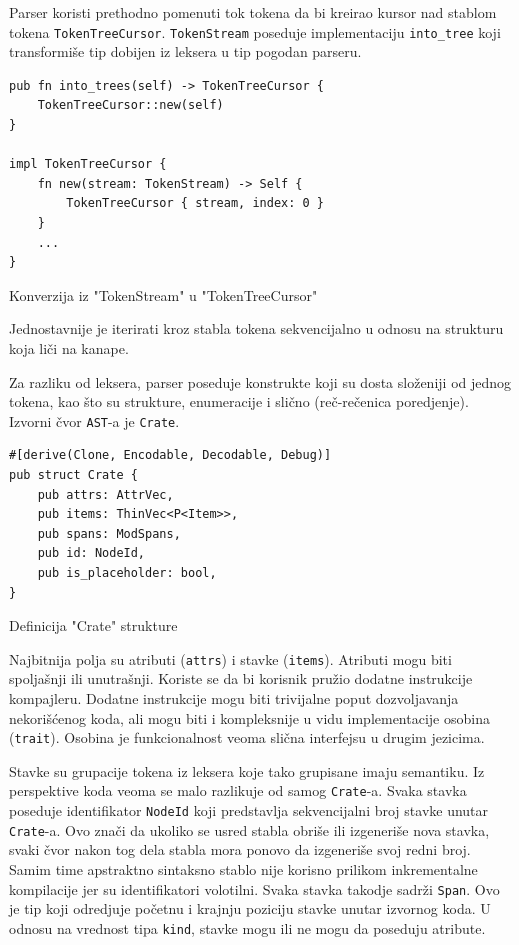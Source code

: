 \documentclass[11pt]{article}
\begin{document}
Parser koristi prethodno pomenuti tok tokena da bi kreirao kursor nad stablom tokena \verb|TokenTreeCursor|.
\verb|TokenStream| poseduje implementaciju \verb|into_tree| koji transformiše tip dobijen iz leksera
u tip pogodan parseru.

\begin{listing}[H]
\begin{verbatim}
pub fn into_trees(self) -> TokenTreeCursor {
    TokenTreeCursor::new(self)
}

impl TokenTreeCursor {
    fn new(stream: TokenStream) -> Self {
        TokenTreeCursor { stream, index: 0 }
    }
    ...
}
\end{verbatim}
\caption{Konverzija iz "TokenStream" u "TokenTreeCursor"}
\end{listing}
Jednostavnije je iterirati kroz stabla tokena sekvencijalno u odnosu na strukturu koja liči na kanape.

Za razliku od leksera, parser poseduje konstrukte koji su dosta složeniji od jednog tokena, kao što su 
strukture, enumeracije i slično (reč-rečenica poredjenje). Izvorni čvor \verb|AST|-a je \verb|Crate|.

\begin{listing}[H]
\begin{verbatim}
#[derive(Clone, Encodable, Decodable, Debug)]
pub struct Crate {
    pub attrs: AttrVec,
    pub items: ThinVec<P<Item>>,
    pub spans: ModSpans,
    pub id: NodeId,
    pub is_placeholder: bool,
}
\end{verbatim}
\caption{Definicija "Crate" strukture}
\end{listing}

\newpage

Najbitnija polja su atributi (\verb|attrs|) i stavke (\verb|items|). Atributi mogu biti spoljašnji ili unutrašnji.
Koriste se da bi korisnik pružio dodatne instrukcije kompajleru. 
Dodatne instrukcije mogu biti trivijalne poput dozvoljavanja
nekorišćenog koda, ali mogu biti i kompleksnije u vidu implementacije osobina 
(\verb|trait|). Osobina je funkcionalnost veoma slična interfejsu u drugim jezicima. 




Stavke su grupacije tokena iz leksera koje tako grupisane imaju semantiku. Iz perspektive koda 
veoma se malo razlikuje od samog \verb|Crate|-a. Svaka stavka poseduje identifikator \verb|NodeId| 
koji predstavlja sekvencijalni broj stavke unutar \verb|Crate|-a. Ovo znači da ukoliko se usred stabla 
obriše ili izgeneriše nova stavka, svaki čvor nakon tog dela stabla mora ponovo da izgeneriše svoj redni broj.
Samim time apstraktno sintaksno stablo nije korisno prilikom inkrementalne kompilacije jer su identifikatori
volotilni. Svaka stavka takodje sadrži \verb|Span|. Ovo je tip koji odredjuje početnu i krajnju poziciju 
stavke unutar izvornog koda. U odnosu na vrednost tipa \verb|kind|, stavke mogu ili ne mogu da poseduju atribute. 
\end{document}
